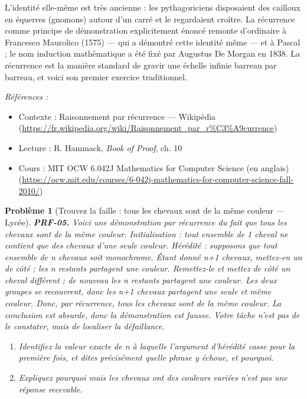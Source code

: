 \documentclass[11pt]{article}
\newtheorem{problem}{Problème}
\newenvironment{refs}{\par\small\noindent\emph{Références :}\begin{itemize}\setlength\itemsep{0pt}}{\end{itemize}\normalsize}
\begin{document}
\noindent L'identité elle-même est très ancienne : les pythagoriciens disposaient des
cailloux en équerres (gnomons) autour d'un carré et le regardaient croître. La récurrence
comme principe de démonstration explicitement énoncé remonte d'ordinaire à Francesco
Maurolico (1575) --- qui a démontré cette identité même --- et à Pascal ; le nom \og{} induction
mathématique \fg{} a été fixé par Augustus De Morgan en 1838. La récurrence est la manière
standard de gravir une échelle infinie barreau par barreau, et voici son premier exercice
traditionnel.

\begin{refs}
\item Contexte : Raisonnement par récurrence --- Wikipédia (\url{https://fr.wikipedia.org/wiki/Raisonnement_par_r%C3%A9currence})
\item Lecture : R. Hammack, \textit{Book of Proof}, ch. 10
\item Cours : MIT OCW 6.042J Mathematics for Computer Science (en anglais) (\url{https://ocw.mit.edu/courses/6-042j-mathematics-for-computer-science-fall-2010/})
\end{refs}

\bigskip

\begin{problem}[{Trouvez la faille : tous les chevaux sont de la même couleur --- Lycée}]
\textbf{PRF-05.} Voici une \og{} démonstration \fg{} par récurrence du fait que tous les
chevaux sont de la même couleur. \textit{Initialisation : tout ensemble de 1 cheval ne contient
que des chevaux d'une seule couleur. Hérédité : supposons que tout ensemble de n chevaux
soit monochrome. Étant donné n+1 chevaux, mettez-en un de côté ; les n restants partagent
une couleur. Remettez-le et mettez de côté un cheval différent ; de nouveau les n restants
partagent une couleur. Les deux groupes se recouvrent, donc les n+1 chevaux partagent une
seule et même couleur. Donc, par récurrence, tous les chevaux sont de la même couleur.}
La conclusion est absurde, donc la démonstration est fausse. Votre tâche n'est pas de le
constater, mais de localiser la défaillance.
\begin{enumerate}
\item[(a)] Identifiez la valeur exacte de n à laquelle l'argument d'hérédité casse pour la
première fois, et dites précisément quelle phrase y échoue, et pourquoi.
\item[(b)] Expliquez pourquoi \og{} mais les chevaux ont des couleurs variées \fg{} n'est pas une réponse
recevable.
\end{enumerate}

\end{problem}
\end{document}
